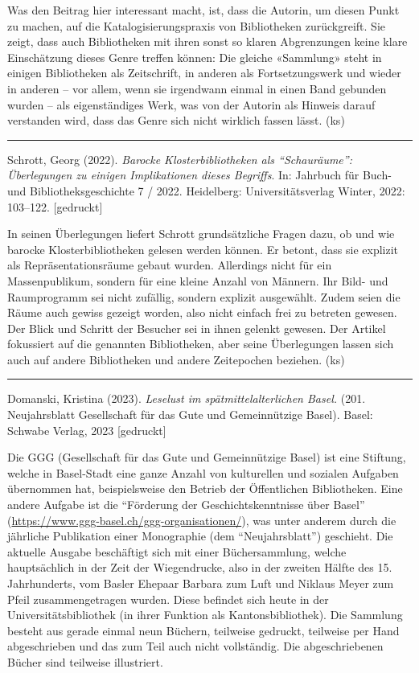 \documentclass[a4paper,
fontsize=11pt,
oneside,
numbers=noperiodatend,
parskip=half-,
bibliography=totoc,
final
]{scrartcl}
\begin{document}
Was den Beitrag hier interessant macht, ist, dass die Autorin, um diesen
Punkt zu machen, auf die Katalogisierungspraxis von Bibliotheken
zurückgreift. Sie zeigt, dass auch Bibliotheken mit ihren sonst so
klaren Abgrenzungen keine klare Einschätzung dieses Genre treffen
können: Die gleiche «Sammlung» steht in einigen Bibliotheken als
Zeitschrift, in anderen als Fortsetzungswerk und wieder in anderen --
vor allem, wenn sie irgendwann einmal in einen Band gebunden wurden --
als eigenständiges Werk, was von der Autorin als Hinweis darauf
verstanden wird, dass das Genre sich nicht wirklich fassen lässt. (ks)

\begin{center}\rule{0.5\linewidth}{0.5pt}\end{center}

Schrott, Georg (2022). \emph{Barocke Klosterbibliotheken als
\enquote{Schauräume}: Überlegungen zu einigen Implikationen dieses
Begriffs}. In: Jahrbuch für Buch- und Bibliotheksgeschichte 7 / 2022.
Heidelberg: Universitätsverlag Winter, 2022: 103--122. {[}gedruckt{]}

In seinen Überlegungen liefert Schrott grundsätzliche Fragen dazu, ob
und wie barocke Klosterbibliotheken gelesen werden können. Er betont,
dass sie explizit als Repräsentationsräume gebaut wurden. Allerdings
nicht für ein Massenpublikum, sondern für eine kleine Anzahl von
Männern. Ihr Bild- und Raumprogramm sei nicht zufällig, sondern explizit
ausgewählt. Zudem seien die Räume auch gewiss gezeigt worden, also nicht
einfach frei zu betreten gewesen. Der Blick und Schritt der Besucher sei
in ihnen gelenkt gewesen. Der Artikel fokussiert auf die genannten
Bibliotheken, aber seine Überlegungen lassen sich auch auf andere
Bibliotheken und andere Zeitepochen beziehen. (ks)

\begin{center}\rule{0.5\linewidth}{0.5pt}\end{center}

Domanski, Kristina (2023). \emph{Leselust im spätmittelalterlichen
Basel.} (201. Neujahrsblatt Gesellschaft für das Gute und Gemeinnützige
Basel). Basel: Schwabe Verlag, 2023 {[}gedruckt{]}

Die GGG (Gesellschaft für das Gute und Gemeinnützige Basel) ist eine
Stiftung, welche in Basel-Stadt eine ganze Anzahl von kulturellen und
sozialen Aufgaben übernommen hat, beispielsweise den Betrieb der
Öffentlichen Bibliotheken. Eine andere Aufgabe ist die
\enquote{Förderung der Geschichtskenntnisse über Basel}
(\url{https://www.ggg-basel.ch/ggg-organisationen/}), was unter anderem
durch die jährliche Publikation einer Monographie (dem
\enquote{Neujahrsblatt}) geschieht. Die aktuelle Ausgabe beschäftigt
sich mit einer Büchersammlung, welche hauptsächlich in der Zeit der
Wiegendrucke, also in der zweiten Hälfte des 15. Jahrhunderts, vom
Basler Ehepaar Barbara zum Luft und Niklaus Meyer zum Pfeil
zusammengetragen wurden. Diese befindet sich heute in der
Universitätsbibliothek (in ihrer Funktion als Kantonsbibliothek). Die
Sammlung besteht aus gerade einmal neun Büchern, teilweise gedruckt,
teilweise per Hand abgeschrieben und das zum Teil auch nicht
vollständig. Die abgeschriebenen Bücher sind teilweise illustriert.
\end{document}
